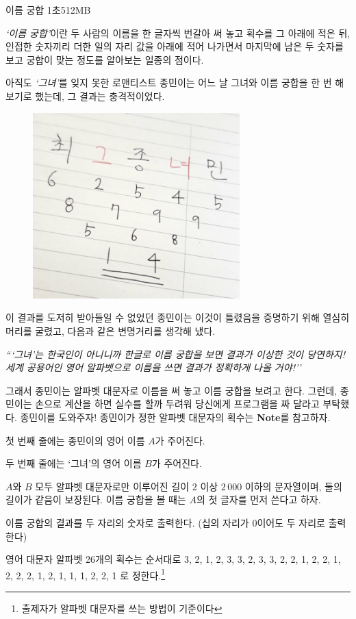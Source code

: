 \begin{problem}{이름 궁합}
{}{}
{1초}{512MB}{}

\textit{`이름 궁합'}이란 두 사람의 이름을 한 글자씩 번갈아 써 놓고 획수를 그 아래에 적은 뒤, 인접한 숫자끼리 더한 일의 자리 값을 아래에 적어 나가면서 마지막에 남은 두 숫자를 보고 궁합이 맞는 정도를 알아보는 일종의 점이다.

아직도 \textit{`그녀'}를 잊지 못한 로맨티스트 종민이는 어느 날 그녀와 이름 궁합을 한 번 해 보기로 했는데, 그 결과는 충격적이었다.

\begin{figure}[h]
	\includegraphics[width=8cm]{./problems/H_namechemi_1.jpg}
	\centering
\end{figure}

이 결과를 도저히 받아들일 수 없었던 종민이는 이것이 틀렸음을 증명하기 위해 열심히 머리를 굴렸고, 다음과 같은 변명거리를 생각해 냈다.

\textit{```그녀'는 한국인이 아니니까 한글로 이름 궁합을 보면 결과가 이상한 것이 당연하지! 세계 공용어인 영어 알파벳으로 이름을 쓰면 결과가 정확하게 나올 거야!''}

그래서 종민이는 알파벳 대문자로 이름을 써 놓고 이름 궁합을 보려고 한다. 그런데, 종민이는 손으로 계산을 하면 실수를 할까 두려워 당신에게 프로그램을 짜 달라고 부탁했다. 종민이를 도와주자!
종민이가 정한 알파벳 대문자의 획수는 \textbf{Note}를 참고하자.

\InputFile

첫 번째 줄에는 종민이의 영어 이름 $A$가 주어진다. 

두 번째 줄에는 `그녀'의 영어 이름 $B$가 주어진다.

$A$와 $B$ 모두 알파벳 대문자로만 이루어진 길이 $2$ 이상 $2\, 000$ 이하의 문자열이며, 둘의 길이가 같음이 보장된다. 이름 궁합을 볼 때는 $A$의 첫 글자를 먼저 쓴다고 하자.

\OutputFile

이름 궁합의 결과를 두 자리의 숫자로 출력한다. (십의 자리가 0이어도 두 자리로 출력한다)

\Examples
	
\begin{example}
%
\end{example} 

\Note

영어 대문자 알파벳 26개의 획수는 순서대로 3, 2, 1, 2, 3, 3, 2, 3, 3, 2, 2, 1, 2, 2, 1, 2, 2, 2, 1, 2, 1, 1, 1, 2, 2, 1 로 정한다.\footnote{출제자가 알파벳 대문자를 쓰는 방법이 기준이다}

\end{problem}
